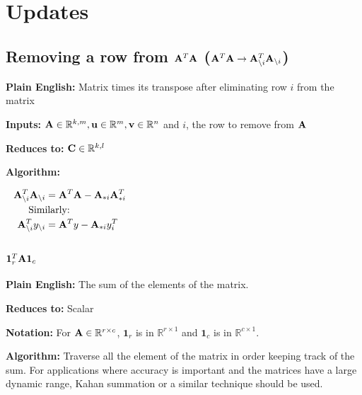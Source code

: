 \chapter{Updates}

\section{Removing a row from $\mathbf{A}^T\mathbf{A}$ ($\mathbf{A}^T\mathbf{A}\rightarrow \mathbf{A}_{\setminus i}^T\mathbf{A}_{\setminus i}$)}

\textbf{Plain English:} Matrix times its transpose after eliminating row $i$ from the matrix

\textbf{Inputs:} $\mathbf{A}\in\mathbb{R}^{k,m},\mathbf{u}\in\mathbb{R}^{m},\mathbf{v}\in\mathbb{R}^{n}$ and $i$, the row to remove from $\mathbf{A}$

\textbf{Reduces to:} $\mathbf{C}\in\mathbb{R}^{k,l}$

\textbf{Algorithm:}


\begin{align}
\mA_{\bs i}^T\mA_{\bs i} &= \mA^T\mA-\mA_{*i}\mA_{*i}^T \\
\noalign{Similarly:}
\mA_{\bs i}^T  y_{\bs i} &= \mA^Ty  -\mA_{*i}y_i^T
\end{align}


\section{$\mathbf{1}_r^T \mathbf{A} \mathbf{1}_c$}

\textbf{Plain English:} The sum of the elements of the matrix.

\textbf{Reduces to:} Scalar

\textbf{Notation:} For $\mathbf{A} \in \mathbb{R}^{r\times c}$, $\mathbf{1}_r$ is in $\mathbb{R}^{r \times 1}$ and $\mathbf{1}_c$ is in $\mathbb{R}^{c \times 1}$.

\textbf{Algorithm:} Traverse all the element of the matrix in order keeping track of the sum. For applications where accuracy is important and the matrices have a large dynamic range, Kahan summation or a similar technique should be used.

